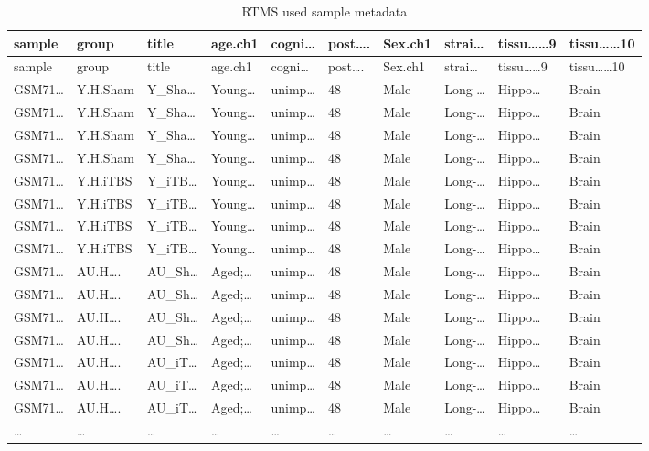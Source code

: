 \documentclass[
]{article}
\begin{document}
\begin{longtable}[]{@{}llllllllll@{}}
\caption{\label{tab:rTMS-used-sample-metadata}RTMS used sample metadata}\tabularnewline
\toprule
sample & group & title & age.ch1 & cogni\ldots{} & post\ldots. & Sex.ch1 & strai\ldots{} & tissu\ldots\ldots9 & tissu\ldots\ldots10\tabularnewline
\midrule
\endfirsthead
\toprule
sample & group & title & age.ch1 & cogni\ldots{} & post\ldots. & Sex.ch1 & strai\ldots{} & tissu\ldots\ldots9 & tissu\ldots\ldots10\tabularnewline
\midrule
\endhead
GSM71\ldots{} & Y.H.Sham & Y\_Sha\ldots{} & Young\ldots{} & unimp\ldots{} & 48 & Male & Long-\ldots{} & Hippo\ldots{} & Brain\tabularnewline
GSM71\ldots{} & Y.H.Sham & Y\_Sha\ldots{} & Young\ldots{} & unimp\ldots{} & 48 & Male & Long-\ldots{} & Hippo\ldots{} & Brain\tabularnewline
GSM71\ldots{} & Y.H.Sham & Y\_Sha\ldots{} & Young\ldots{} & unimp\ldots{} & 48 & Male & Long-\ldots{} & Hippo\ldots{} & Brain\tabularnewline
GSM71\ldots{} & Y.H.Sham & Y\_Sha\ldots{} & Young\ldots{} & unimp\ldots{} & 48 & Male & Long-\ldots{} & Hippo\ldots{} & Brain\tabularnewline
GSM71\ldots{} & Y.H.iTBS & Y\_iTB\ldots{} & Young\ldots{} & unimp\ldots{} & 48 & Male & Long-\ldots{} & Hippo\ldots{} & Brain\tabularnewline
GSM71\ldots{} & Y.H.iTBS & Y\_iTB\ldots{} & Young\ldots{} & unimp\ldots{} & 48 & Male & Long-\ldots{} & Hippo\ldots{} & Brain\tabularnewline
GSM71\ldots{} & Y.H.iTBS & Y\_iTB\ldots{} & Young\ldots{} & unimp\ldots{} & 48 & Male & Long-\ldots{} & Hippo\ldots{} & Brain\tabularnewline
GSM71\ldots{} & Y.H.iTBS & Y\_iTB\ldots{} & Young\ldots{} & unimp\ldots{} & 48 & Male & Long-\ldots{} & Hippo\ldots{} & Brain\tabularnewline
GSM71\ldots{} & AU.H\ldots. & AU\_Sh\ldots{} & Aged;\ldots{} & unimp\ldots{} & 48 & Male & Long-\ldots{} & Hippo\ldots{} & Brain\tabularnewline
GSM71\ldots{} & AU.H\ldots. & AU\_Sh\ldots{} & Aged;\ldots{} & unimp\ldots{} & 48 & Male & Long-\ldots{} & Hippo\ldots{} & Brain\tabularnewline
GSM71\ldots{} & AU.H\ldots. & AU\_Sh\ldots{} & Aged;\ldots{} & unimp\ldots{} & 48 & Male & Long-\ldots{} & Hippo\ldots{} & Brain\tabularnewline
GSM71\ldots{} & AU.H\ldots. & AU\_Sh\ldots{} & Aged;\ldots{} & unimp\ldots{} & 48 & Male & Long-\ldots{} & Hippo\ldots{} & Brain\tabularnewline
GSM71\ldots{} & AU.H\ldots. & AU\_iT\ldots{} & Aged;\ldots{} & unimp\ldots{} & 48 & Male & Long-\ldots{} & Hippo\ldots{} & Brain\tabularnewline
GSM71\ldots{} & AU.H\ldots. & AU\_iT\ldots{} & Aged;\ldots{} & unimp\ldots{} & 48 & Male & Long-\ldots{} & Hippo\ldots{} & Brain\tabularnewline
GSM71\ldots{} & AU.H\ldots. & AU\_iT\ldots{} & Aged;\ldots{} & unimp\ldots{} & 48 & Male & Long-\ldots{} & Hippo\ldots{} & Brain\tabularnewline
\ldots{} & \ldots{} & \ldots{} & \ldots{} & \ldots{} & \ldots{} & \ldots{} & \ldots{} & \ldots{} & \ldots{}\tabularnewline
\bottomrule
\end{longtable}
\end{document}
